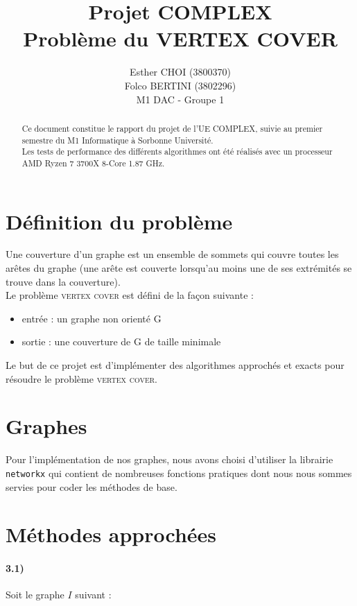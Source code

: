 \documentclass[12pt]{article}
\title{Projet COMPLEX\\Problème du VERTEX COVER}
\author{Esther CHOI (3800370)\\Folco BERTINI (3802296)\\M1 DAC - Groupe 1}
\begin{document}
\maketitle
\tableofcontents

\begin{abstract}
    Ce document constitue le rapport du projet de l'UE COMPLEX, suivie au premier semestre du M1 Informatique à Sorbonne Université. \\
    Les tests de performance des différents algorithmes ont été réalisés avec un processeur AMD Ryzen 7 3700X 8-Core 1.87 GHz. \\
\end{abstract}

\newpage

\section{Définition du problème}

    Une couverture d'un graphe est un ensemble de sommets qui couvre toutes les arêtes du graphe (une arête est couverte lorsqu'au moins une de ses extrémités se trouve dans la couverture). \\
    Le problème \textsc{vertex cover} est défini de la façon suivante :

    \begin{itemize}
        \item entrée : un graphe non orienté G
        \item sortie : une couverture de G de taille minimale
    \end{itemize}

    Le but de ce projet est d'implémenter des algorithmes approchés et exacts pour résoudre le problème \textsc{vertex cover}.

\section{Graphes}

    Pour l'implémentation de nos graphes, nous avons choisi d'utiliser la librairie \texttt{networkx} qui contient de nombreuses fonctions pratiques dont nous nous sommes servies pour coder les méthodes de base.
    
\section{Méthodes approchées}

    \paragraph{3.1)}
        Soit le graphe $I$ suivant :
\end{document}
